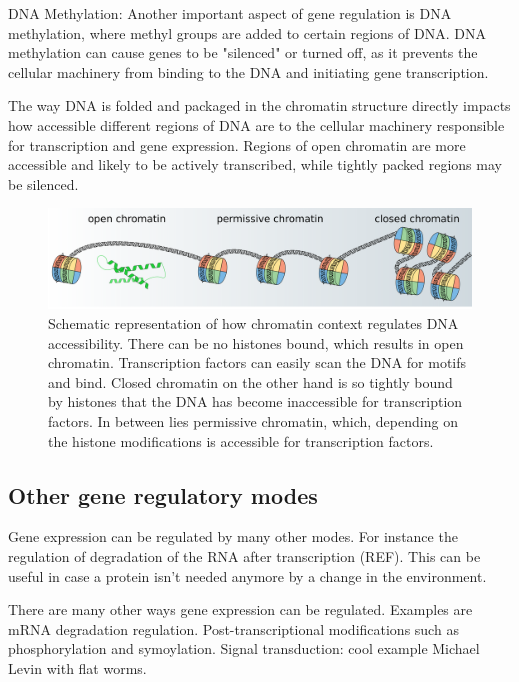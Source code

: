 DNA Methylation: Another important aspect of gene regulation is DNA methylation, where methyl groups are added to certain regions of DNA. DNA methylation can cause genes to be "silenced" or turned off, as it prevents the cellular machinery from binding to the DNA and initiating gene transcription.

The way DNA is folded and packaged in the chromatin structure directly impacts how accessible different regions of DNA are to the cellular machinery responsible for transcription and gene expression. Regions of open chromatin are more accessible and likely to be actively transcribed, while tightly packed regions may be silenced.

\begin{figure}
    \includegraphics[width=\linewidth]{ch.introduction/imgs/accessibility_horizontal.png}
    \caption{Schematic representation of how chromatin context regulates DNA accessibility. There can be no histones bound, which results in open chromatin. Transcription factors can easily scan the DNA for motifs and bind. Closed chromatin on the other hand is so tightly bound by histones that the DNA has become inaccessible for transcription factors. In between lies permissive chromatin, which, depending on the histone modifications is accessible for transcription factors.}
    \label{fig:accessibility}
\end{figure}

\subsection{Other gene regulatory modes}

Gene expression can be regulated by many other modes. For instance the regulation of degradation of the RNA after transcription (REF). This can be useful in case a protein isn't needed anymore by a change in the environment. 

There are many other ways gene expression can be regulated. Examples are mRNA degradation regulation. Post-transcriptional modifications such as phosphorylation and symoylation. Signal transduction: cool example Michael Levin with flat worms.

